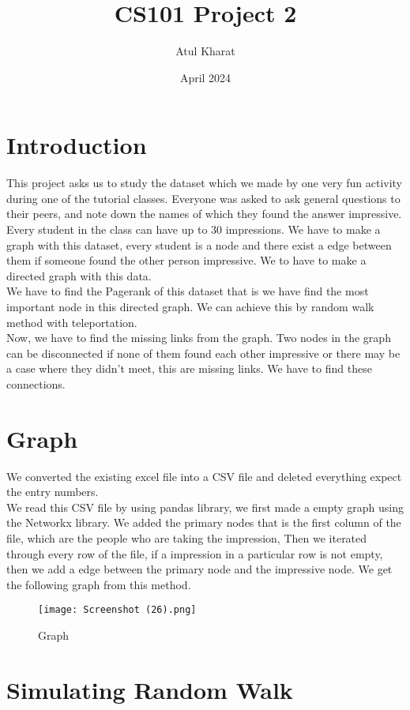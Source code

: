 \documentclass{article}
\title{CS101 Project 2}
\author{Atul Kharat}
\date{April 2024}
\begin{document}
\maketitle

\section{Introduction}
This project asks us to study the dataset which we made by one very fun activity during one of the tutorial classes. Everyone was asked to ask general questions to their peers, and note down the names of which they found the answer impressive. Every student in the class can have up to 30 impressions. We have to make a graph with this dataset, every student is a node and there exist a edge between them if someone found the other person impressive. We to have to make a directed graph with this data.\\
We have to find the Pagerank of this dataset that is we have find the most important node in this directed graph. We can achieve this by random walk method with teleportation.\\
Now, we have to find the missing links from the graph. Two nodes in the graph can be disconnected if none of them found each other impressive or there may be a case where they didn't meet, this are missing links. We have to find these connections.
\section{Graph}
We converted the existing excel file into a CSV file and deleted everything expect the entry numbers. \\
We read this CSV file by using pandas library,  we first made a empty graph using the Networkx library.  We added the primary nodes that is the first column of the file, which are the people who are taking the impression, Then we iterated through every row of the file, if a impression in a particular row is not empty, then we add a edge between the primary node and the impressive node. We get the following graph from this method.
\begin{figure}[t]
    \centering
    \texttt{[image: Screenshot (26).png]}
    \caption{Graph}
    \label{fig:enter-label}
\end{figure}
\section{Simulating Random Walk}
\end{document}
